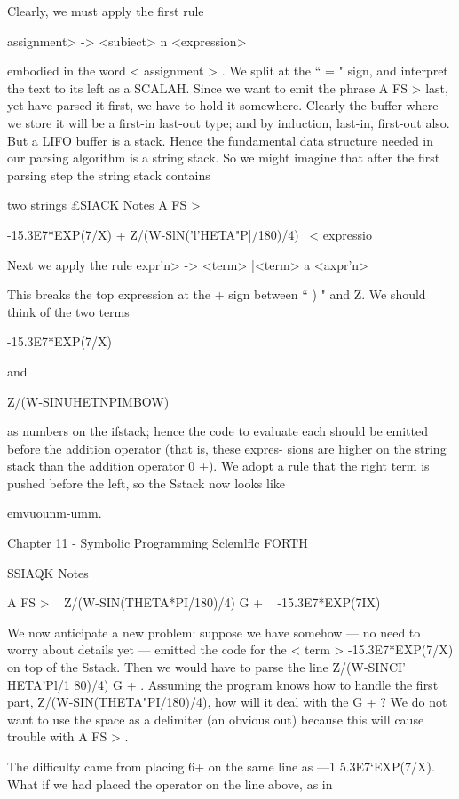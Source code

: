 Clearly, we must apply the first rule

\<assignment> -> <subiect> n <expression>

embodied in the word < assignment > . We split at the “ = " sign,
and interpret the text to its left as a SCALAH. Since we want to
emit the phrase A FS > last, yet have parsed it first, we have to
hold it somewhere. Clearly the buffer where we store it will be a
first-in last-out type; and by induction, last-in, first-out also. But
a LIFO buffer is a stack. Hence the fundamental data structure
needed in our parsing algorithm is a string stack. So we might
imagine that after the first parsing step the string stack contains

 

two strings
£SIACK Notes
A FS > \ < subject >

-15.3E7*EXP(7/X) + Z/(W-SlN('l’HETA"P|/180)/4) \ < expressio

Next we apply the rule
\<expr'n> -> <term> |<term> a <axpr'n>

This breaks the top expression at the + sign between “ ) " and Z.
We should think of the two terms

-15.3E7*EXP(7/X)

and

Z/(W-SINUHETNPIMBOW)

as numbers on the ifstack; hence the code to evaluate each should
be emitted before the addition operator (that is, these expres-
sions are higher on the string stack than the addition operator
0 +). We adopt a rule that the right term is pushed before the
left, so the Sstack now looks like

emvuounm-umm.

Chapter 11 - Symbolic Programming Sclemlﬂc FORTH

 

SSIAQK Notes

A FS > \ < subject >
Z/(W-SIN(THETA*PI/180)/4) G + \ <term >
-15.3E7*EXP(7IX) \ < term >

We now anticipate a new problem: suppose we have somehow —
no need to worry about details yet — emitted the code for the
< term > -15.3E7*EXP(7/X) on top of the Sstack. Then we
would have to parse the line Z/(W-SINCI’ HETA'Pl/1 80)/4) G + .
Assuming the program knows how to handle the first part,
Z/(W-SIN(THETA"PI/180)/4), how will it deal with the G + ?
We do not want to use the space as a delimiter (an obvious out)
because this will cause trouble with A FS > .

The difficulty came from placing 6+ on the same line as
—1 5.3E7‘EXP(7/X). What if we had placed the operator on the
line above, as in

